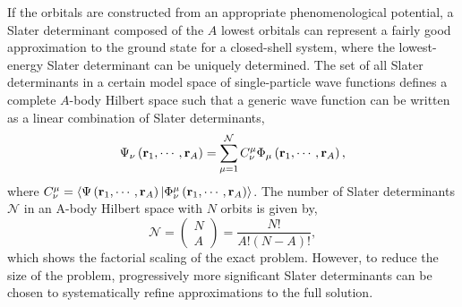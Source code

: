 \documentclass[thesis.tex]{subfiles}
\begin{document}
If the orbitals are constructed from an appropriate phenomenological potential, a Slater determinant composed of the $A$ lowest orbitals can represent a fairly good approximation to the ground state for a closed-shell system, where the lowest-energy Slater determinant can be uniquely determined.  The set of all Slater determinants in a certain model space of single-particle wave functions defines a complete $A$-body Hilbert space such that a generic wave function can be written as a linear combination of Slater determinants,
\begin{equation}
  \Psi_{\nu}\left(\mathbf{r}_{1},\cdots,\mathbf{r}_{A}\right) = \sum_{\mathclap{\mu = 1}}^{\mathcal{N}} C^{\mu}_{\nu}\Phi_{\mu}\left(\mathbf{r}_{1},\cdots,\mathbf{r}_{A}\right),
\end{equation}
where $C^{\mu}_{\nu} = \langle \Psi\left(\mathbf{r}_{1},\cdots,\mathbf{r}_{A}\right) | \Phi^{\mu}_{\nu}\left(\mathbf{r}_{1},\cdots,\mathbf{r}_{A}\right)\rangle$.  The number of Slater determinants $\mathcal{N}$ in an A-body Hilbert space with $N$ orbits is given by,
\begin{equation} \label{eq:factorialscaling}
  \mathcal{N} = \left(\begin{matrix} N \\ A \end{matrix}\right) = \frac{N!}{A!(N - A)!},
\end{equation}
which shows the factorial scaling of the exact problem.  However, to reduce the size of the problem, progressively more significant Slater determinants can be chosen to systematically refine approximations to the full solution.
\end{document}
